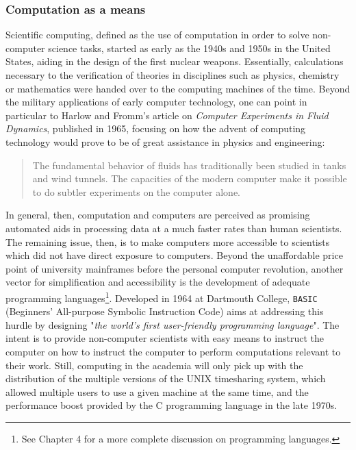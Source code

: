 \subsubsection{Computation as a means}

Scientific computing, defined as the use of computation in order to solve non-computer science tasks, started as early as the 1940s and 1950s in the United States, aiding in the design of the first nuclear weapons\cite{oberkampf_verification_2010}. Essentially, calculations necessary to the verification of theories in disciplines such as physics, chemistry or mathematics were handed over to the computing machines of the time. Beyond the military applications of early computer technology, one can point in particular to Harlow and Fromm's article on \emph{Computer Experiments in Fluid Dynamics}, published in 1965, focusing on how the advent of computing technology would prove to be of great assistance in physics and engineering:

\begin{quote}
  The fundamental behavior of fluids has traditionally been studied in tanks and wind tunnels. The capacities of the modern computer make it possible to do subtler experiments on the computer alone.\cite{harlow_computer_1965}
\end{quote}

In general, then, computation and computers are perceived as promising automated aids in processing data at a much faster rates than human scientists\cite{licklider_mancomputer_1960}. The remaining issue, then, is to make computers more accessible to scientists which did not have direct exposure to computers. Beyond the unaffordable price point of university mainframes before the personal computer revolution, another vector for simplification and accessibility is the development of adequate programming languages\footnote{See Chapter 4 for a more complete discussion on programming languages.}. Developed in 1964 at Dartmouth College, \lstinline{BASIC} (Beginners' All-purpose Symbolic Instruction Code) aims at addressing this hurdle by designing "\emph{the world's first user-friendly programming language}"\cite{brooks_finally_2019}. The intent is to provide non-computer scientists with easy means to instruct the computer on how to instruct the computer to perform computations relevant to their work. Still, computing in the academia will only pick up with the distribution of the multiple versions of the UNIX timesharing system, which allowed multiple users to use a given machine at the same time, and the performance boost provided by the C programming language in the late 1970s.

